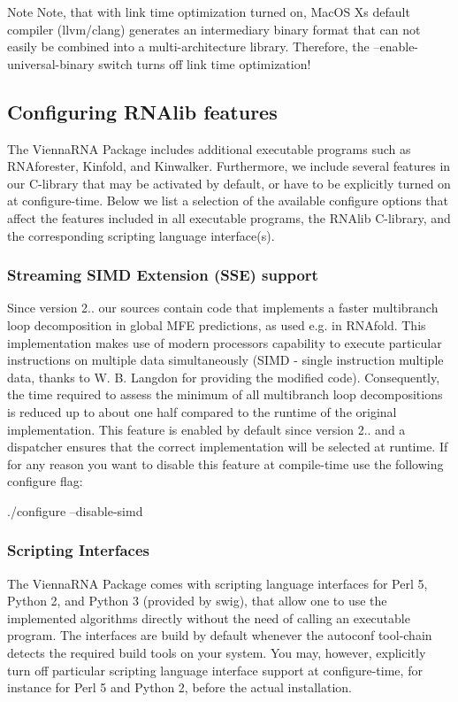 \begin{DoxyNote}{Note}
Note, that with link time optimization turned on, Mac\+OS X\textquotesingle{}s default compiler (llvm/clang) generates an intermediary binary format that can not easily be combined into a multi-\/architecture library. Therefore, the --enable-\/universal-\/binary switch turns off link time optimization!
\end{DoxyNote}
\hypertarget{install_configuration}{}\subsection{Configuring R\+N\+Alib features}\label{install_configuration}
The Vienna\+R\+NA Package includes additional executable programs such as R\+N\+Aforester, Kinfold, and Kinwalker. Furthermore, we include several features in our C-\/library that may be activated by default, or have to be explicitly turned on at configure-\/time. Below we list a selection of the available configure options that affect the features included in all executable programs, the R\+N\+Alib C-\/library, and the corresponding scripting language interface(s).\hypertarget{install_config_simd}{}\subsubsection{Streaming S\+I\+M\+D Extension (\+S\+S\+E) support}\label{install_config_simd}
Since version 2.. our sources contain code that implements a faster multibranch loop decomposition in global M\+FE predictions, as used e.\+g. in R\+N\+Afold. This implementation makes use of modern processors capability to execute particular instructions on multiple data simultaneously (S\+I\+MD -\/ single instruction multiple data, thanks to W. B. Langdon for providing the modified code). Consequently, the time required to assess the minimum of all multibranch loop decompositions is reduced up to about one half compared to the runtime of the original implementation. This feature is enabled by default since version 2.. and a dispatcher ensures that the correct implementation will be selected at runtime. If for any reason you want to disable this feature at compile-\/time use the following configure flag\+:

\begin{DoxyVerb}./configure --disable-simd
\end{DoxyVerb}
\hypertarget{install_config_swig}{}\subsubsection{Scripting Interfaces}\label{install_config_swig}
The Vienna\+R\+NA Package comes with scripting language interfaces for Perl 5, Python 2, and Python 3 (provided by swig), that allow one to use the implemented algorithms directly without the need of calling an executable program. The interfaces are build by default whenever the autoconf tool-\/chain detects the required build tools on your system. You may, however, explicitly turn off particular scripting language interface support at configure-\/time, for instance for Perl 5 and Python 2, before the actual installation.


